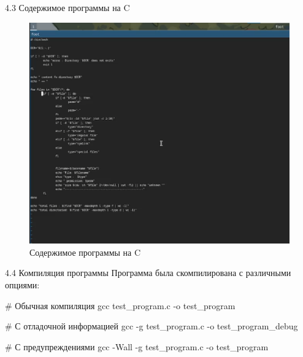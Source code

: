 \documentclass[
  ignorenonframetext,
  aspectratio=169,
  russian,
]{beamer}
\newenvironment{Shaded}{\begin{snugshade}}{\end{snugshade}}
\newcommand{\AttributeTok}[1]{\textcolor[rgb]{0.40,0.45,0.13}{#1}}
\newcommand{\CommentTok}[1]{\textcolor[rgb]{0.37,0.37,0.37}{#1}}
\newcommand{\FunctionTok}[1]{\textcolor[rgb]{0.28,0.35,0.67}{#1}}
\newcommand{\NormalTok}[1]{\textcolor[rgb]{0.00,0.23,0.31}{#1}}
\begin{document}
\begin{frame}{4.3 Содержимое программы на C}
\label{ux441ux43eux434ux435ux440ux436ux438ux43cux43eux435-ux43fux440ux43eux433ux440ux430ux43cux43cux44b-ux43dux430-c}
\begin{figure}[H]

{\centering \includegraphics[width=0.7\linewidth,height=\textheight,keepaspectratio]{image/content2.png}

}

\caption{Содержимое программы на C}

\end{figure}%
\end{frame}

\begin{frame}[fragile]{4.4 Компиляция программы}
\label{ux43aux43eux43cux43fux438ux43bux44fux446ux438ux44f-ux43fux440ux43eux433ux440ux430ux43cux43cux44b}
Программа была скомпилирована с различными опциями:

\begin{Shaded}
\begin{Highlighting}[]
\CommentTok{\# Обычная компиляция}
\FunctionTok{gcc}\NormalTok{ test\_program.c }\AttributeTok{{-}o}\NormalTok{ test\_program}

\CommentTok{\# С отладочной информацией}
\FunctionTok{gcc} \AttributeTok{{-}g}\NormalTok{ test\_program.c }\AttributeTok{{-}o}\NormalTok{ test\_program\_debug}

\CommentTok{\# С предупреждениями}
\FunctionTok{gcc} \AttributeTok{{-}Wall} \AttributeTok{{-}g}\NormalTok{ test\_program.c }\AttributeTok{{-}o}\NormalTok{ test\_program}
\end{Highlighting}
\end{Shaded}
\end{frame}
\end{document}
